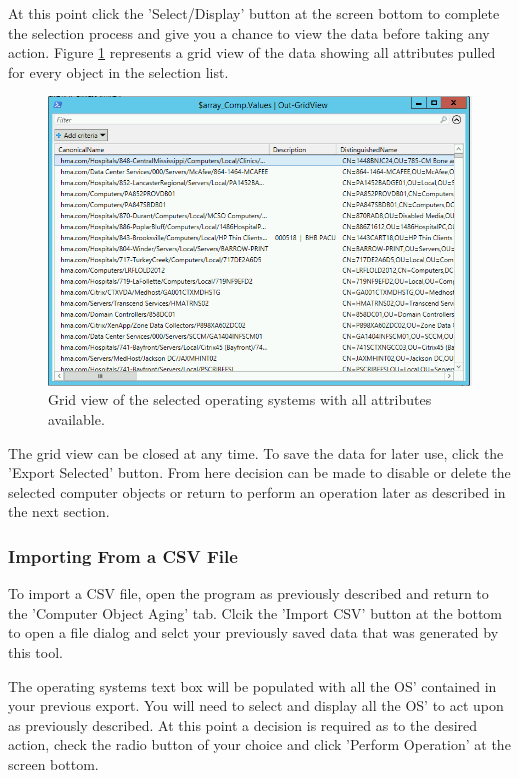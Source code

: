 \documentclass[12pt,a4paper,titlepage]{article}
\begin{document}
	At this point click the 'Select/Display' button at the screen bottom to complete the selection process and give you a chance to view the data before taking any action. Figure \ref{fig:cot-grid} represents a grid view of the data showing all attributes pulled for every object in the selection list.
	
	\begin{figure}[h!]
		\centering
		\includegraphics[width=0.9\linewidth]{images/COT-grid}
		\caption{Grid view of the selected operating systems with all attributes available.}
		\label{fig:cot-grid}
	\end{figure}
	
	The grid view can be closed at any time. To save the data for later use, click the 'Export Selected' button.
	From here decision can be made to disable or delete the selected computer objects or return to perform an operation later as described in the next section.
	
	\subsubsection{Importing From a CSV File}
	To import a CSV file, open the program as previously described and return to the 'Computer Object Aging' tab. Clcik the 'Import CSV' button at the bottom to open a file dialog and selct your previously saved data that was generated by this tool.
	
	The operating systems text box will be populated with all the OS' contained in your previous export. You will need to select and display all the OS' to act upon as previously described. At this point a decision is required as to the desired action, check the radio button of your choice and click 'Perform Operation'  at the screen bottom.
\end{document}
